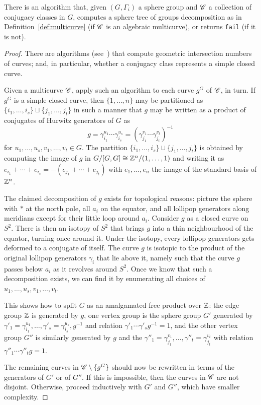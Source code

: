 \documentclass{amsart}
\begin{document}
\begin{thm}\label{thm:mc to gog}
  There is an algorithm that, given $(G,\Gamma_i)$ a sphere group and ${\mathscr C}$
  a collection of conjugacy classes in $G$, computes a sphere tree of
  groups decomposition as in Definition~\ref{def:multicurve} (if ${\mathscr C}$ is
  an algebraic multicurve), or returns \texttt{fail} (if it is not).
\end{thm}
\begin{proof}
  There are algorithms
  (see~\cites{birman-series:sccs,cohen-lustig:intersectionnumbers})
  that compute geometric intersection numbers of curves; and, in
  particular, whether a conjugacy class represents a simple closed
  curve.

  Given a multicurve ${\mathscr C}$, apply such an algorithm to each curve
  $g^G$ of ${\mathscr C}$, in turn. If $g^G$ is a simple closed curve, then
  $\{1,\dots,n\}$ may be partitioned as
  $\{i_1,\dots,i_s\}\sqcup\{j_1,\dots,j_t\}$ in such a manner that $g$
  may be written as a product of conjugates of Hurwitz generators of
  $G$ as
  \[g=\gamma_{i_1}^{u_1}\cdots\gamma_{i_s}^{u_s}=(\gamma_{j_1}^{v_1}\cdots\gamma_{j_t}^{v_t})^{-1}\]
  for $u_1,\dots,u_s,v_1,\dots,v_t\in G$. The partition
  $\{i_1,\dots,i_s\}\sqcup\{j_1,\dots,j_t\}$ is obtained by computing
  the image of $g$ in $G/[G,G]\cong{\mathbb Z}^n/(1,\dots,1)$ and writing it as
  $e_{i_1}+\cdots+e_{i_s}=-(e_{j_1}+\cdots+e_{j_t})$ with
  $e_1,\dots,e_n$ the image of the standard basis of ${\mathbb Z}^n$.

  The claimed decomposition of $g$ exists for topological reasons:
  picture the sphere with $*$ at the north pole, all $a_i$ on the
  equator, and all lollipop generators along meridians except for
  their little loop around $a_i$. Consider $g$ as a closed curve on
  $S^2$. There is then an isotopy of $S^2$ that brings $g$ into a thin
  neighbourhood of the equator, turning once around it. Under the
  isotopy, every lollipop generators gets deformed to a conjugate of
  itself. The curve $g$ is isotopic to the product of the original
  lollipop generators $\gamma_i$ that lie above it, namely such that
  the curve $g$ passes below $a_i$ as it revolves around $S^2$.  Once
  we know that such a decomposition exists, we can find it by
  enumerating all choices of $u_1,\dots,u_s,v_1,\dots,v_t$.

  This shows how to split $G$ as an amalgamated free product over
  ${\mathbb Z}$: the edge group ${\mathbb Z}$ is generated by $g$, one vertex group is
  the sphere group $G'$ generated by
  $\gamma'_1=\gamma_{i_1}^{u_1},\dots,\gamma'_s=\gamma_{i_s}^{u_s},g^{-1}$
  and relation $\gamma'_1\cdots\gamma'_s g^{-1}=1$, and the other
  vertex group $G''$ is similarly generated by $g$ and the
  $\gamma''_1=\gamma_{j_1}^{v_1},\dots,\gamma''_t=\gamma_{j_t}^{v_t}$
  with relation $\gamma''_1\cdots\gamma''_t g=1$.

  The remaining curves in ${\mathscr C}\setminus\{g^G\}$ should now be
  rewritten in terms of the generators of $G'$ or of $G''$. If this is
  impossible, then the curves in ${\mathscr C}$ are not disjoint. Otherwise,
  proceed inductively with $G'$ and $G''$, which have smaller
  complexity.
\end{proof}
\end{document}
